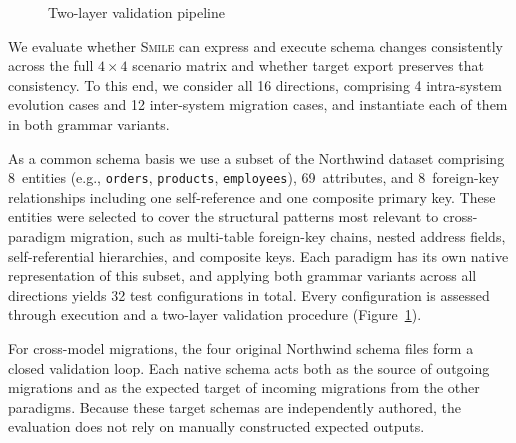 \documentclass{llncs}
\begin{document}
\begin{figure}[htbp]
{%
}%
\caption{Two-layer validation pipeline}
\label{fig:validation-pipeline}
\end{figure}

We evaluate whether \textsc{Smile} can express and execute schema
changes consistently across the full $4 \times 4$ scenario matrix and
whether target export preserves that consistency.
To this end, we consider all 16 directions, comprising
4 intra-system evolution cases and 12 inter-system migration
cases, and instantiate each of them in both grammar variants.

As a common schema basis we use a subset of the Northwind
dataset comprising 8~entities (e.g., \texttt{orders},
\texttt{products}, \texttt{employees}), 69~attributes, and
8~foreign-key relationships including one self-reference and
one composite primary key. These entities were selected to
cover the structural patterns most relevant to cross-paradigm
migration, such as multi-table foreign-key chains, nested
address fields, self-referential hierarchies, and composite
keys. Each paradigm has its own native representation of this
subset, and applying both grammar variants across all
directions yields 32 test configurations in total.
Every configuration is assessed through execution and a
two-layer validation procedure (Figure~\ref{fig:validation-pipeline}).

For cross-model migrations, the four original Northwind schema files form a closed validation loop.
Each native schema acts both as the source of outgoing migrations and as the expected target of incoming migrations from the other paradigms.
Because these target schemas are independently authored, the evaluation does not rely on manually constructed expected outputs.
\end{document}
